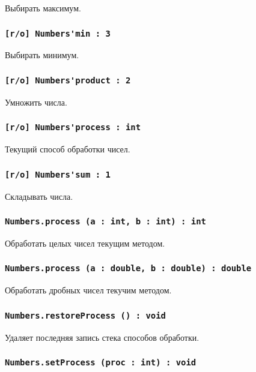 Выбирать максимум.

\subsubsection{\lstinline|[r/o] Numbers'min : 3|}

Выбирать минимум.

\subsubsection{\lstinline|[r/o] Numbers'product : 2|}

Умножить числа.

\subsubsection{\lstinline|[r/o] Numbers'process : int|}

Текущий способ обработки чисел.

\subsubsection{\lstinline|[r/o] Numbers'sum : 1|}

Складывать числа.

\subsubsection{\lstinline|Numbers.process (a : int, b : int) : int|}

Обработать целых чисел текущим методом.

\subsubsection{\lstinline|Numbers.process (a : double, b : double) : double|}

Обработать дробных чисел текучим методом.

\subsubsection{\lstinline|Numbers.restoreProcess () : void|}

Удаляет последняя запись стека способов обработки.

\subsubsection{\lstinline|Numbers.setProcess (proc : int) : void|}

